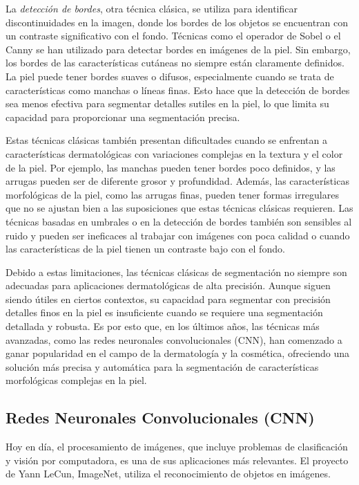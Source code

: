 La \textit{detección de bordes}, otra técnica clásica, se utiliza para identificar discontinuidades en la imagen, donde los bordes de los objetos se encuentran con un contraste significativo con el fondo. Técnicas como el operador de Sobel o el Canny se han utilizado para detectar bordes en imágenes de la piel. Sin embargo, los bordes de las características cutáneas no siempre están claramente definidos. La piel puede tener bordes suaves o difusos, especialmente cuando se trata de características como manchas o líneas finas. Esto hace que la detección de bordes sea menos efectiva para segmentar detalles sutiles en la piel, lo que limita su capacidad para proporcionar una segmentación precisa. \parencite{yoo2020}

Estas técnicas clásicas también presentan dificultades cuando se enfrentan a características dermatológicas con variaciones complejas en la textura y el color de la piel. Por ejemplo, las manchas pueden tener bordes poco definidos, y las arrugas pueden ser de diferente grosor y profundidad. Además, las características morfológicas de la piel, como las arrugas finas, pueden tener formas irregulares que no se ajustan bien a las suposiciones que estas técnicas clásicas requieren. Las técnicas basadas en umbrales o en la detección de bordes también son sensibles al ruido y pueden ser ineficaces al trabajar con imágenes con poca calidad o cuando las características de la piel tienen un contraste bajo con el fondo. \parencite{yoo2020}

Debido a estas limitaciones, las técnicas clásicas de segmentación no siempre son adecuadas para aplicaciones dermatológicas de alta precisión. Aunque siguen siendo útiles en ciertos contextos, su capacidad para segmentar con precisión detalles finos en la piel es insuficiente cuando se requiere una segmentación detallada y robusta. Es por esto que, en los últimos años, las técnicas más avanzadas, como las redes neuronales convolucionales (CNN), han comenzado a ganar popularidad en el campo de la dermatología y la cosmética, ofreciendo una solución más precisa y automática para la segmentación de características morfológicas complejas en la piel. \parencite{yoo2020}


\subsection{Redes Neuronales Convolucionales (CNN)}

Hoy en día, el procesamiento de imágenes, que incluye problemas de clasificación y visión por computadora, es una de sus aplicaciones más relevantes. El proyecto de Yann LeCun, ImageNet, utiliza el reconocimiento de objetos en imágenes.
	

